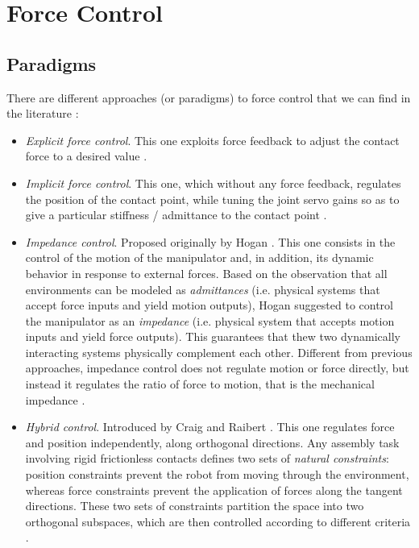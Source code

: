 \section{Force Control}
	\label{sec:force_control}
	
	\subsection{Paradigms}
		\label{sub:paradigms}
		
		There are different approaches (or paradigms) to force control that we can find in the
		literature \cite{DelPrete_PhDThesis2013}:
		\begin{itemize}
			
			\item \emph{Explicit force control}.
						This one exploits force feedback to adjust the
						contact force to a desired value \cite{Volpe_TransAutoControl1993}.
			
			\item \emph{Implicit force control}.
						This one, which without any force feedback, regulates the position of the
						contact point, while tuning the joint servo gains so as	to give a particular
						stiffness / admittance to the contact point	\cite{Rocco_Automatica1997}.
			
			\item \emph{Impedance control}.
						Proposed originally by Hogan \cite{Hogan_AmericanCtrlConf1984}.
						This one consists in the control of the motion of the	manipulator and,
						in addition, its dynamic behavior in response to external	forces.
						Based on the observation that all environments can be modeled as
						\emph{admittances} (i.e. physical systems that accept force inputs
						and yield motion outputs), Hogan suggested to control the manipulator as
						an \emph{impedance} (i.e. physical system that accepts motion inputs
						and yield force outputs).
						This guarantees that thew two dynamically interacting systems physically
						complement each other.
						Different from previous approaches, impedance control does not regulate
						motion or force directly, but instead it regulates the ratio of force to
						motion, that is the mechanical impedance \cite{DeShutter_ControlProblemsRobAuto1998}.
			
			\item \emph{Hybrid control}.
						Introduced by Craig and Raibert \cite{Craig_SoftwareApp1979}.
						This one regulates force and position independently, along orthogonal directions.
						Any assembly task involving rigid frictionless contacts defines two sets of
						\emph{natural constraints}: position constraints prevent the robot from moving
						through the environment, whereas force constraints prevent the application of
						forces along the tangent directions.
						These two sets of constraints partition the space into two orthogonal subspaces,
						which are then controlled according to different criteria
						\cite{Khatib_RoboticsAuto1987}.
						

\end{itemize}
